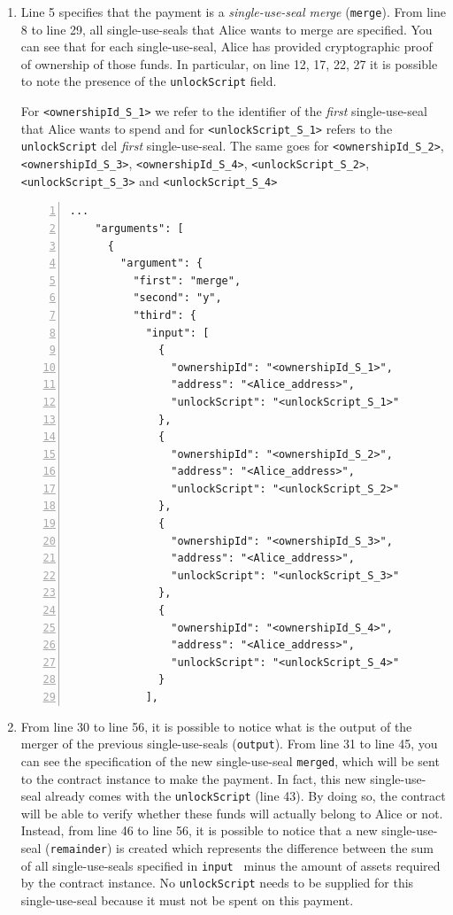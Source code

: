 \begin{enumerate}
  \item Line 5 specifies that the payment is a \textit{single-use-seal merge} (\verb|merge|). From line 8 
  to line 29, all single-use-seals that Alice wants to merge are specified. You can see that for each 
  single-use-seal, Alice has provided cryptographic proof of ownership of those funds. In particular, on 
  line 12, 17, 22, 27 it is possible to note the presence of the \verb|unlockScript| field.

  For \verb|<ownershipId_S_1>| we refer to the identifier of the \textit{first} single-use-seal that Alice 
  wants to spend and for \verb|<unlockScript_S_1>| refers to the \verb|unlockScript| del \textit{first} 
  single-use-seal. The same goes for \verb|<ownershipId_S_2>|, \verb|<ownershipId_S_3>|, 
  \verb|<ownershipId_S_4>|, \verb|<unlockScript_S_2>|, \verb|<unlockScript_S_3>| and 
  \verb|<unlockScript_S_4>|
  \begin{Verbatim}[numbers=left,xleftmargin=1cm,firstnumber=1,breaklines=true,tabsize=2]
    ...
    "arguments": [
      {
        "argument": {
          "first": "merge",
          "second": "y",
          "third": {
            "input": [
              {
                "ownershipId": "<ownershipId_S_1>",
                "address": "<Alice_address>",
                "unlockScript": "<unlockScript_S_1>"
              },
              {
                "ownershipId": "<ownershipId_S_2>",
                "address": "<Alice_address>",
                "unlockScript": "<unlockScript_S_2>"
              },
              {
                "ownershipId": "<ownershipId_S_3>",
                "address": "<Alice_address>",
                "unlockScript": "<unlockScript_S_3>"
              },
              {
                "ownershipId": "<ownershipId_S_4>",
                "address": "<Alice_address>",
                "unlockScript": "<unlockScript_S_4>"
              }
            ],
  \end{Verbatim}

  \item From line 30 to line 56, it is possible to notice what is the output of the merger of the previous 
  single-use-seals (\verb|output|). From line 31 to line 45, you can see the specification of the new 
  single-use-seal \verb|merged|, which will be sent to the contract instance to make the payment. In fact, 
  this new single-use-seal already comes with the \verb|unlockScript| (line 43). By doing so, the contract 
  will be able to verify whether these funds will actually belong to Alice or not. Instead, from line 46 
  to line 56, it is possible to notice that a new single-use-seal (\verb|remainder|) is created which 
  represents the difference between the sum of all single-use-seals specified in \verb|input | minus the 
  amount of assets required by the contract instance. No \verb|unlockScript| needs to be supplied for this 
  single-use-seal because it must not be spent on this payment.


\end{enumerate}

